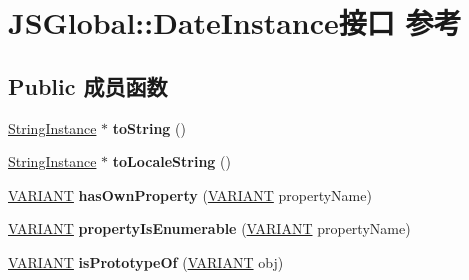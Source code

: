 \hypertarget{interface_j_s_global_1_1_date_instance}{}\section{J\+S\+Global\+:\+:Date\+Instance接口 参考}
\label{interface_j_s_global_1_1_date_instance}
\subsection*{Public 成员函数}
\begin{DoxyCompactItemize}
\item 
\mbox{\label{interface_j_s_global_1_1_date_instance_a7610dd20ba5d29b9ea5151ae54715230}} 
\hyperlink{interface_j_s_global_1_1_string_instance}{String\+Instance} $\ast$ {\bfseries to\+String} ()
\item 
\mbox{\label{interface_j_s_global_1_1_date_instance_adc0c593677abcab6648a268d9638c3f5}} 
\hyperlink{interface_j_s_global_1_1_string_instance}{String\+Instance} $\ast$ {\bfseries to\+Locale\+String} ()
\item 
\mbox{\label{interface_j_s_global_1_1_date_instance_a8bf7d306efd1276bdf05b83f9e3b63af}} 
\hyperlink{structtag_v_a_r_i_a_n_t}{V\+A\+R\+I\+A\+NT} {\bfseries has\+Own\+Property} (\hyperlink{structtag_v_a_r_i_a_n_t}{V\+A\+R\+I\+A\+NT} property\+Name)
\item 
\mbox{\label{interface_j_s_global_1_1_date_instance_a9ba4973f9f9594cf6508ea1c753591d8}} 
\hyperlink{structtag_v_a_r_i_a_n_t}{V\+A\+R\+I\+A\+NT} {\bfseries property\+Is\+Enumerable} (\hyperlink{structtag_v_a_r_i_a_n_t}{V\+A\+R\+I\+A\+NT} property\+Name)
\item 
\mbox{\label{interface_j_s_global_1_1_date_instance_a73bcb4c8348d1e6d089b88ae765adc95}} 
\hyperlink{structtag_v_a_r_i_a_n_t}{V\+A\+R\+I\+A\+NT} {\bfseries is\+Prototype\+Of} (\hyperlink{structtag_v_a_r_i_a_n_t}{V\+A\+R\+I\+A\+NT} obj)
\item 
\mbox{\label{interface_j_s_global_1_1_date_instance_a1d7be94d6964c83360b1682770013726}} 

\end{DoxyCompactItemize}
